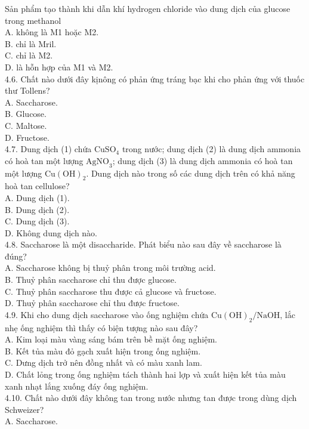 \documentclass[10pt]{article}
\begin{document}
Sản phẩm tạo thành khi dẫn khí hydrogen chloride vào dung dịch của glucose trong methanol\\
A. không là M1 hoặc M2.\\
B. chỉ là Mril.\\
C. chỉ là M2.\\
D. là hỗn hợp của M1 và M2.\\
4.6. Chất nào dưới đây kịnông có phản ứng tráng bạc khi cho phản ứng với thuốc thư Tollens?\\
A. Saccharose.\\
B. Glucose.\\
C. Maltose.\\
D. Fructose.\\
4.7. Dung dịch (1) chứa $\mathrm{CuSO}_{4}$ trong nước; dung dịch (2) là dung dịch ammonia có hoà tan một lượng $\mathrm{AgNO}_{3}$; dung dịch (3) là dung dịch ammonia có hoà tan một lượng $\mathrm{Cu}(\mathrm{OH})_{2}$. Dung dịch nào trong số các dung dịch trên có khả năng hoà tan cellulose?\\
A. Dung dịch (1).\\
B. Dung dịch (2).\\
C. Dung dịch (3).\\
D. Không dung dịch nào.\\
4.8. Saccharose là một disaccharide. Phát biểu nào sau đây về saccharose là đúng?\\
A. Saccharose không bị thuỷ phân trong môi trường acid.\\
B. Thuỷ phân saccharose chỉ thu được glucose.\\
C. Thuỷ phân saccharose thu được cả glucose và fructose.\\
D. Thuỷ phân saccharose chỉ thu được fructose.\\
4.9. Khi cho dung dịch saccharose vào ống nghiệm chứa $\mathrm{Cu}(\mathrm{OH})_{2} / \mathrm{NaOH}$, lắc nhẹ ống nghiệm thì thấy có biện tượng nào sau đây?\\
A. Kim loại màu vàng sáng bám trên bề mặt ống nghiệm.\\
B. Kết tủa màu đỏ gạch xuất hiện trong ống nghiệm.\\
C. Dưng dịch trở nên đồng nhất và có màu xanh lam.\\
D. Chất lỏng trong ống nghiệm tách thành hai lợp và xuất hiện kết tủa màu xanh nhạt lắng xuống đáy ống nghiệm.\\
4.10. Chất nào dưới đây không tan trong nước nhưng tan được trong dùng dịch Schweizer?\\
A. Saccharose.\\
\end{document}
